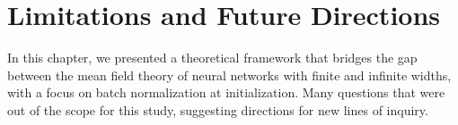 






\section{Limitations and Future Directions}
In this chapter, we presented a theoretical framework that bridges the gap between the mean field theory of neural networks with finite and infinite widths, with a focus on batch normalization at initialization. Many questions that were out of the scope for this study, suggesting directions for new lines of inquiry. 


